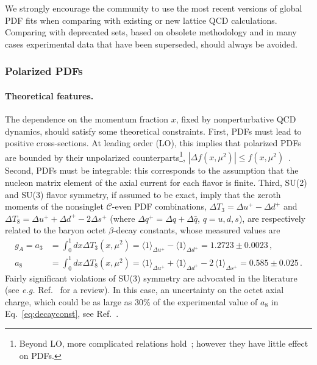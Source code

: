 We strongly encourage the community to use the most recent versions
of global PDF fits when comparing with existing or new
lattice QCD calculations.
%
Comparing with deprecated sets, based on obsolete methodology
and in many cases experimental data that have been
superseded, should always be avoided.

\subsubsection{Polarized PDFs}
\label{sec:polPDFs}

\paragraph*{Theoretical features.}

The dependence on the momentum fraction $x$, fixed by nonperturbative QCD 
dynamics, should satisfy some theoretical constraints.
%
First, PDFs must lead to positive cross-sections.
At leading order (LO), this implies that polarized 
PDFs are bounded by their unpolarized counterparts\footnote{Beyond LO, more 
complicated relations hold~\cite{Altarelli:1998gn}; however they have little
effect on PDFs.}, $|\Delta f(x,\mu^2)|\leq f(x,\mu^2)$~\cite{Altarelli:1998gn}.
%
Second, PDFs must be integrable: this corresponds to the assumption 
that the nucleon matrix element of the axial current for each flavor is finite.
%
Third, SU(2) and SU(3) flavor symmetry, if assumed to be exact, imply that 
the zeroth moments of the nonsinglet $\mathcal{C}$-even PDF combinations,
$\Delta T_3=\Delta u^+ -\Delta d^+$ and 
$\Delta T_8 = \Delta u^+ +\Delta d^+ -2\Delta s^+$ 
(where $\Delta q^+=\Delta q+\Delta\bar{q}$, $q=u,d,s$), are respectively
related to the baryon octet $\beta$-decay constants, whose 
measured values are~\cite{Olive:2016xmw}
\begin{align}
 g_A  = a_3
 & =
 \int_0^1 dx \Delta T_3 (x,\mu^2)
 = \langle 1\rangle_{\Delta u^+} - \langle 1\rangle_{\Delta d^+}  = 1.2723 \pm 0.0023\,,
 \label{eq:a3}
 \\
 a_8
 & =
 \int_0^1 dx \Delta T_8 (x,\mu^2)
 = \langle 1 \rangle_{\Delta u^+} + \langle 1 \rangle_{\Delta d^+} -2\,\langle 1 \rangle_{\Delta s^+} 
 =0.585  \pm 0.025
 \,.
\label{eq:decayconst}
\end{align}
%
Fairly significant violations of SU(3) symmetry are advocated
in the literature (see {\it e.g.} Ref.~\cite{Cabibbo:2003cu} for a review). 
%
In this case, an uncertainty on the octet axial charge, which could be as 
large as 30\% of the experimental value of $a_8$ in Eq.~\eqref{eq:decayconst}, 
see Ref.~\cite{FloresMendieta:1998ii}. 

